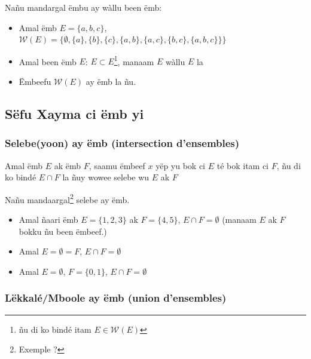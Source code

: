 \documentclass[twoside, a4paper]{article}
\begin{document}
Nañu mandargal ëmbu ay wàllu been ëmb:
\begin{itemize}
  \item Amal ëmb $E=\{a,b,c\}$, $\mathcal{W}(E) = \big\{\emptyset, \{a\}, \{b\}, \{c\}, \{a,b\}, \{a,c\}, \{b,c\}, \{a,b,c\}\}\big\}$
\end{itemize}

\begin{tcolorbox}[enhanced jigsaw,breakable,pad at break*=1mm,
    colback=yellow!5!white,colframe=white!75!black,title= Seetlu,
    watermark color=white]
  \begin{itemize}
    \item Amal been ëmb $E$: $E\subset E$\footnote{ñu di ko bindé itam  $E \in\mathcal{W}(E)$}, manaam $E$ wàllu $E$ la
    \item Ëmbeefu $\mathcal{W}(E)$ ay ëmb la ñu.
  \end{itemize}
\end{tcolorbox}


\subsection{Sëfu Xayma ci ëmb yi}
\subsubsection{Selebe(yoon) ay ëmb (intersection d'ensembles)}

\begin{tcolorbox}[enhanced jigsaw,breakable,pad at break*=1mm,
    colback=red!5!white,colframe=white!75!black,title= Téeki,
    watermark color=white]
  Amal ëmb $E$ ak ëmb $F$, saamu ëmbeef $x$ yëp yu bok ci $E$ té bok itam ci $F$, ñu di ko bindé $E \cap F$  la ñuy wowee selebe wu $E$ ak $F$
\end{tcolorbox}

Nañu mandaargal\footnote{Exemple ?} selebe ay ëmb.
\begin{itemize}
  \item Amal  ñaari ëmb $E = \{1,2,3\}$ ak $F=\{4,5\}$, $E \cap F = \emptyset$ (manaam $E$ ak $F$ bokku ñu been ëmbeef.)
  \item Amal $E = \emptyset = F$, $E \cap F = \emptyset$
  \item Amal $E = \emptyset$, $F = \{0,1\}$, $E \cap F = \emptyset$
\end{itemize}

\subsubsection{Lëkkalé/Mboole ay ëmb (union d'ensembles)}
\end{document}
